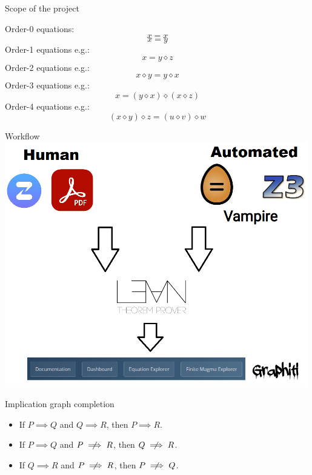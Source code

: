 \documentclass{beamer}
\newcommand{\op}{\diamond}
\begin{document}
\begin{frame}{Scope of the project}

Order-0 equations:\vspace*{-1mm}
\[ x = x \tag{E1} \]
\[ x = y \tag{E2} \]
Order-1 equations e.g.:\vspace*{-1mm}
\[ x = y \op z \tag{E7} \]
Order-2 equations e.g.:\vspace*{-3mm}
\[ x \op y = y \op x \tag{E43} \]
Order-3 equations e.g.:\vspace*{-2mm}
\[ x = (y \op x) \op (x \op z) \tag{E168} \]
Order-4 equations e.g.:\vspace*{-2mm}
\[ (x \op y) \op z = (u \op v) \op w \tag{E4694} \]

\end{frame}


\begin{frame}{Workflow}
\includegraphics[width=0.99\textwidth]{prooflow}
\end{frame}


\begin{frame}{Implication graph completion}
\begin{itemize}
	\item If $P \implies Q$ and $Q \implies R$, then $P \implies R$.
	\item If $P \implies Q$ and $P \centernot\implies R$, then $Q \centernot\implies R$.
	\item If $Q \implies R$ and $P \centernot\implies R$, then $P \centernot\implies Q$.
\end{itemize}
\end{frame}
\end{document}
